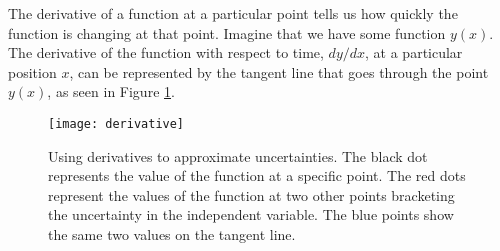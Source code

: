 The derivative of a function at a particular point tells us how quickly
the function is changing at that point. Imagine that we have some function
$y(x)$. The derivative of the function with respect to time, $dy/dx$, at
a particular position $x$, can be represented by the tangent line that goes 
through the point $y(x)$, as seen in 
Figure \ref{fig:derivative}. 
\begin{figure}[htbp!]
\centering
\texttt{[image: derivative]}
\caption[Using derivatives to approximate uncertainties]{Using derivatives to
approximate uncertainties. The black dot represents the value of the function
at a specific point. The red dots represent the values of the function at
two other points bracketing the uncertainty in the independent variable. The
blue points show the same two values on the tangent line.}
\label{fig:derivative}
\end{figure}

